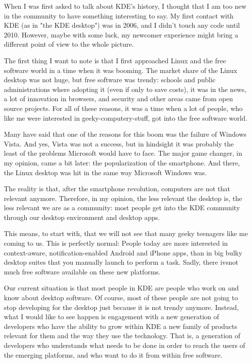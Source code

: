 

\noindent{}When I was first asked to talk about KDE’s history, I thought that I am too new in the community to have something interesting to say. My first contact with KDE (as in "the KDE desktop") was in 2006, and I didn’t touch any code until 2010. However, maybe with some luck, my newcomer experience might bring a different point of view to the whole picture.

The first thing I want to note is that I first approached Linux and the free software world in a time when it was booming. The market share of the Linux desktop was not huge, but free software was trendy: schools and public administrations where adopting it (even if only to save costs), it was in the news, a lot of innovation in browsers, and security and other areas came from open source projects. For all of these reasons, it was a time when a lot of people, who like me were interested in geeky-computery-stuff, got into the free software world.

Many have said that one of the reasons for this boom was the failure of Windows Vista. And yes, Vista was not a success, but in hindsight it was probably the least of the problems Microsoft would have to face. The major game changer, in my opinion, came a bit later: the popularization of the smartphone. And there, the Linux desktop was hit in the same way Microsoft Windows was.

The reality is that, after the smartphone revolution, computers are not that relevant anymore. Therefore, in my opinion, the less relevant the desktop is, the less relevant we are as a community: most people get into the KDE community through our desktop environment and desktop apps. 

This means, to start with, that we will not see that many geeky teenagers like me coming to us. This is perfectly normal: People today are more interested in context-aware, notification-enabled Android and iPhone apps, than in big bulky desktop suites that you manually launch to perform a task. Sadly, there ivsnot much free software available on these new platforms.

Our current situation is that most people in KDE are people who work on and know about desktop software. Of course, most of these people are not going to stop developing for the desktop just because it is not trendy anymore. Instead, what I would like to see happen is engagement with a new generation of developers who have the ability to grow within KDE a new family of products relevant for them and the way they use the technology. That is, a generation of developers who understands what needs to be done in order to reach the users of the emerging platforms, and who want to do it from within free software.

